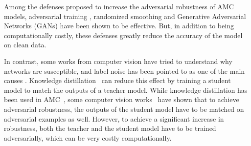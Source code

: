 \documentclass[conference]{IEEEtran}
\newcommand{\pf}[1]{{\textcolor{orange}{PF: {#1}}}}
\begin{document}
Among the defenses proposed to increase the adversarial robustness of AMC models, adversarial training \cite{maroto2021safeamc,manoj2022toward}, randomized smoothing \cite{kim2021channel,manoj2022toward} and Generative Adversarial Networks (GANs) \cite{wang2022gan} have been shown to be effective. But, in addition to being computationally costly, these defenses greatly reduce the accuracy of the model on clean data.

In contrast, some works from computer vision have tried to understand why networks are susceptible, and label noise has been pointed to as one of the main causes \cite{sanyal2020benign}. Knowledge distillation~\cite{hinton2015distilling,romero2014fitnets,zagoruyko2016paying,chebotar2016distilling} can reduce this effect by training a student model to match the outputs of a teacher model. While knowledge distillation has been used in AMC~\cite{ma2020cross}, some computer vision works~\cite{goldblum2020adversarially,zi2021revisiting,shao2021and,maroto2022benefits} have shown that to achieve adversarial robustness, the outputs of the student model have to be matched on adversarial examples as well. However, to achieve a significant increase in robustness, both the teacher and the student model have to be trained adversarially, which can be very costly computationally. 

\end{document}
